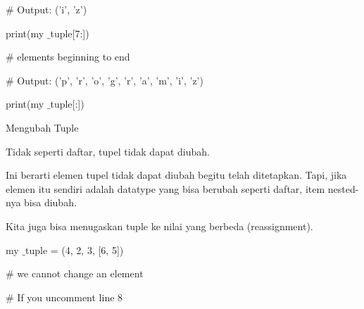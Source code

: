 \documentclass[a4paper,12pt]{report}
\begin{document}
\noindent 
{\fontsize{20pt}{20pt}\selectfont  $  \#  $ Output: ('i', 'z') \\} \par
\noindent 
{\fontsize{20pt}{20pt}\selectfont print(my $  \_  $tuple[7:]) \\} \par
\vspace{20pt}
\noindent 
{\fontsize{20pt}{20pt}\selectfont  $  \#  $ elements beginning to end \\} \par
\noindent 
{\fontsize{20pt}{20pt}\selectfont  $  \#  $ Output: ('p', 'r', 'o', 'g', 'r', 'a', 'm', 'i', 'z') \\} \par
\noindent 
{\fontsize{20pt}{20pt}\selectfont print(my $  \_  $tuple[:]) \\} \par
\vspace{20pt}
\noindent 
{\fontsize{14pt}{14pt}\selectfont Mengubah Tuple \\} \par
\vspace{14pt}
\noindent 
{\fontsize{14pt}{14pt}\selectfont Tidak seperti daftar, tupel tidak dapat diubah. \\} \par
\vspace{14pt}
\noindent 
{\fontsize{14pt}{14pt}\selectfont Ini berarti elemen tupel tidak dapat diubah begitu telah ditetapkan. Tapi, jika elemen itu sendiri adalah datatype yang bisa berubah seperti daftar, item nested-nya bisa diubah. \\} \par
\vspace{14pt}
\noindent 
{\fontsize{14pt}{14pt}\selectfont Kita juga bisa menugaskan tuple ke nilai yang berbeda (reassignment). \\} \par
\vspace{16pt}
\noindent 
{\fontsize{16pt}{16pt}\selectfont my $  \_  $tuple = (4, 2, 3, [6, 5]) \\} \par
\vspace{16pt}
\noindent 
{\fontsize{16pt}{16pt}\selectfont  $  \#  $ we cannot change an element \\} \par
\noindent 
{\fontsize{16pt}{16pt}\selectfont  $  \#  $ If you uncomment line 8 \\} \par
\noindent 
\end{document}
